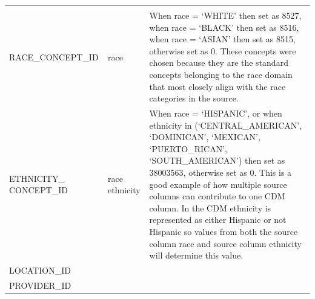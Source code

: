 \documentclass[10.5pt]{book}
\theoremstyle{definition}
\theoremstyle{definition}
\theoremstyle{definition}
\theoremstyle{remark}
\begin{document}
\begin{longtable}[]{@{}lll@{}}
\begin{minipage}[t]{0.50\columnwidth}
\end{minipage}\tabularnewline
\begin{minipage}[t]{0.28\columnwidth}\raggedright\strut
RACE\_CONCEPT\_ID\strut
\end{minipage} & \begin{minipage}[t]{0.13\columnwidth}\raggedright\strut
race\strut
\end{minipage} & \begin{minipage}[t]{0.50\columnwidth}\raggedright\strut
When race = `WHITE' then set as 8527, when race = `BLACK' then set as
8516, when race = `ASIAN' then set as 8515, otherwise set as 0. These
concepts were chosen because they are the standard concepts belonging to
the race domain that most closely align with the race categories in the
source.\strut
\end{minipage}\tabularnewline
\begin{minipage}[t]{0.28\columnwidth}\raggedright\strut
ETHNICITY\_ CONCEPT\_ID\strut
\end{minipage} & \begin{minipage}[t]{0.13\columnwidth}\raggedright\strut
race ethnicity\strut
\end{minipage} & \begin{minipage}[t]{0.50\columnwidth}\raggedright\strut
When race = `HISPANIC', or when ethnicity in (`CENTRAL\_AMERICAN',
`DOMINICAN', `MEXICAN', `PUERTO\_RICAN', `SOUTH\_AMERICAN') then set as
38003563, otherwise set as 0. This is a good example of how multiple
source columns can contribute to one CDM column. In the CDM ethnicity is
represented as either Hispanic or not Hispanic so values from both the
source column race and source column ethnicity will determine this
value.\strut
\end{minipage}\tabularnewline
\begin{minipage}[t]{0.28\columnwidth}\raggedright\strut
LOCATION\_ID\strut
\end{minipage} & \begin{minipage}[t]{0.13\columnwidth}\raggedright\strut
\strut
\end{minipage} & \begin{minipage}[t]{0.50\columnwidth}\raggedright\strut
\strut
\end{minipage}\tabularnewline
\begin{minipage}[t]{0.28\columnwidth}\raggedright\strut
PROVIDER\_ID\strut
\end{minipage} & \begin{minipage}[t]{0.13\columnwidth}\raggedright\strut

\end{minipage}
\end{longtable}
\end{document}
